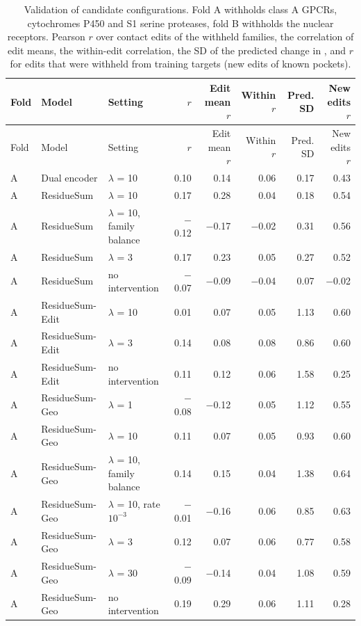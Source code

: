 \begin{longtable}{llp{3.3cm}rrrrr}
\caption{Validation of candidate configurations. Fold A withholds class A GPCRs, cytochromes P450 and S1 serine proteases, fold B withholds the nuclear receptors. Pearson $r$ over contact edits of the withheld families, the correlation of edit means, the within-edit correlation, the SD of the predicted change in \kcal{}, and $r$ for edits that were withheld from training targets (new edits of known pockets).}
\label{tab:si_val}\\
\toprule
Fold & Model & Setting & $r$ & Edit mean $r$ & Within $r$ & Pred. SD & New edits $r$ \\
\midrule
\endfirsthead
Fold & Model & Setting & $r$ & Edit mean $r$ & Within $r$ & Pred. SD & New edits $r$ \\
\midrule
\endhead
A & Dual encoder & $\lambda$ = 10 & 0.10 & 0.14 & 0.06 & 0.17 & 0.43 \\
A & ResidueSum & $\lambda$ = 10 & 0.17 & 0.28 & 0.04 & 0.18 & 0.54 \\
A & ResidueSum & $\lambda$ = 10, family balance & $-$0.12 & $-$0.17 & $-$0.02 & 0.31 & 0.56 \\
A & ResidueSum & $\lambda$ = 3 & 0.17 & 0.23 & 0.05 & 0.27 & 0.52 \\
A & ResidueSum & no intervention & $-$0.07 & $-$0.09 & $-$0.04 & 0.07 & $-$0.02 \\
A & ResidueSum-Edit & $\lambda$ = 10 & 0.01 & 0.07 & 0.05 & 1.13 & 0.60 \\
A & ResidueSum-Edit & $\lambda$ = 3 & 0.14 & 0.08 & 0.08 & 0.86 & 0.60 \\
A & ResidueSum-Edit & no intervention & 0.11 & 0.12 & 0.06 & 1.58 & 0.25 \\
A & ResidueSum-Geo & $\lambda$ = 1 & $-$0.08 & $-$0.12 & 0.05 & 1.12 & 0.55 \\
A & ResidueSum-Geo & $\lambda$ = 10 & 0.11 & 0.07 & 0.05 & 0.93 & 0.60 \\
A & ResidueSum-Geo & $\lambda$ = 10, family balance & 0.14 & 0.15 & 0.04 & 1.38 & 0.64 \\
A & ResidueSum-Geo & $\lambda$ = 10, rate $10^{-3}$ & $-$0.01 & $-$0.16 & 0.06 & 0.85 & 0.63 \\
A & ResidueSum-Geo & $\lambda$ = 3 & 0.12 & 0.07 & 0.06 & 0.77 & 0.58 \\
A & ResidueSum-Geo & $\lambda$ = 30 & $-$0.09 & $-$0.14 & 0.04 & 1.08 & 0.59 \\
A & ResidueSum-Geo & no intervention & 0.19 & 0.29 & 0.06 & 1.11 & 0.28 \\

\end{longtable}
